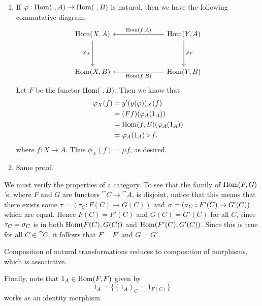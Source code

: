 \documentclass[../../solutions.tex]{subfiles}
\begin{document}
\begin{exercise}
\begin{enumerate}
\item
If $\varphi:\operatorname{Hom}(~,A)\to\operatorname{Hom}(~,B)$ is natural, then we have the following commutative diagram:
\[
\begin{tikzcd}[row sep=huge, column sep=2.5cm]
\Hom(X,A)\ar[d,"\phi_X",swap] & \Hom(Y,A)\ar[l,"\Hom(f{,}A)",swap]\ar[d,"\phi_Y"] \\
\Hom(X,B) & \Hom(Y,B)\ar[l,"\Hom(f{,}B)"]
\end{tikzcd}
\]
Let $F$ be the functor $\operatorname{Hom}(~,B)$.
Then we know that
\begin{align*}
\varphi_X(f)&=y'(y(\varphi))_X(f)\\
&=(Ff)(\varphi_A(1_A))\\
&=\operatorname{Hom}(f,B)(\varphi_A(1_A))\\
&=\varphi_A(1_A)\circ f,
\end{align*}
where $f:X\to A$.
Thus $\phi_X(f)=\mu f$, as desired.


\item
Same proof.
\end{enumerate}
\end{exercise}

\begin{exercise} \leavevmode
We must verify the properties of a category.
To see that the family of $\operatorname{Hom}(F,G)$'s, where $F$ and $G$ are functors $\cat C\to\cat A$, is disjoint, notice that this means that there exists some $\tau=(\tau_C:F(C)\to G(C))$ and $\sigma=(\sigma_C:F'(C)\to G'(C))$ which are equal.
Hence $F(C)=F'(C)$ and $G(C)=G'(C)$ for all $C$, since $\tau_C=\sigma_C$ is in both $\operatorname{Hom}(F(C),G(C))$ and $\operatorname{Hom}(F'(C),G'(C))$.
Since this is true for all $C\in\cat C$, it follows that $F=F'$ and $G=G'$.

Composition of natural transformations reduces to composition of morphisms, which is associative.

Finally, note that $1_A\in\operatorname{Hom}(F,F)$ given by
\[1_A=\{(1_A)_C=1_{F(C)}\}\]
works as an identity morphism.
\end{exercise}
\end{document}
